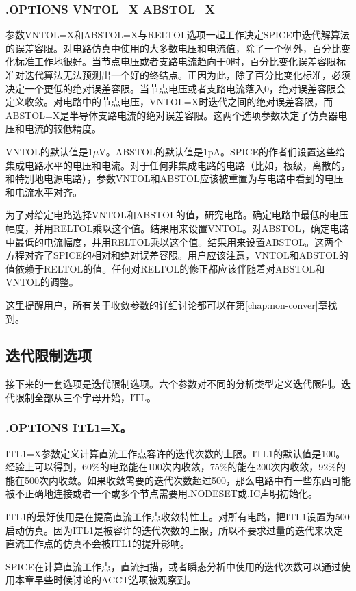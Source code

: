 \subsubsection{.OPTIONS VNTOL=X ABSTOL=X}
参数VNTOL=X和ABSTOL=X与RELTOL选项一起工作决定SPICE中迭代解算法的误差容限。对电路仿真中使用的大多数电压和电流值，除了一个例外，百分比变化标准工作地很好。当节点电压或者支路电流趋向于0时，百分比变化误差容限标准对迭代算法无法预测出一个好的终结点。正因为此，除了百分比变化标准，必须决定一个更低的绝对误差容限。当节点电压或者支路电流落入0，绝对误差容限会定义收敛。对电路中的节点电压，VNTOL=X时迭代之间的绝对误差容限，而ABSTOL=X是半导体支路电流的绝对误差容限。这两个选项参数决定了仿真器电压和电流的较低精度。

VNTOL的默认值是1$\mu$V。ABSTOL的默认值是1pA。SPICE的作者们设置这些给集成电路水平的电压和电流。对于任何非集成电路的电路（比如，板级，离散的，和特别地电源电路），参数VNTOL和ABSTOL应该被重置为与电路中看到的电压和电流水平对齐。

为了对给定电路选择VNTOL和ABSTOL的值，研究电路。确定电路中最低的电压幅度，并用RELTOL乘以这个值。结果用来设置VNTOL。对ABSTOL，确定电路中最低的电流幅度，并用RELTOL乘以这个值。结果用来设置ABSTOL。这两个方程对齐了SPICE的相对和绝对误差容限。用户应该注意，VNTOL和ABSTOL的值依赖于RELTOL的值。任何对RELTOL的修正都应该伴随着对ABSTOL和VNTOL的调整。

这里提醒用户，所有关于收敛参数的详细讨论都可以在第\ref{chap:non-conver}章找到。

\subsection{迭代限制选项}
接下来的一套选项是迭代限制选项。六个参数对不同的分析类型定义迭代限制。迭代限制全部从三个字母开始，ITL。

\subsubsection{.OPTIONS ITL1=X。}
ITL1=X参数定义计算直流工作点容许的迭代次数的上限。ITL1的默认值是100。经验上可以得到，60\%的电路能在100次内收敛，75\%的能在200次内收敛，92\%的能在500次内收敛。如果收敛需要的迭代次数超过500，那么电路中有一些东西可能被不正确地连接或者一个或多个节点需要用.NODESET或.IC声明初始化。

ITL1的最好使用是在提高直流工作点收敛特性上。对所有电路，把ITL1设置为500启动仿真。因为ITL1是被容许的迭代次数的上限，所以不要求过量的迭代来决定直流工作点的仿真不会被ITL1的提升影响。

SPICE在计算直流工作点，直流扫描，或者瞬态分析中使用的迭代次数可以通过使用本章早些时候讨论的ACCT选项被观察到。


